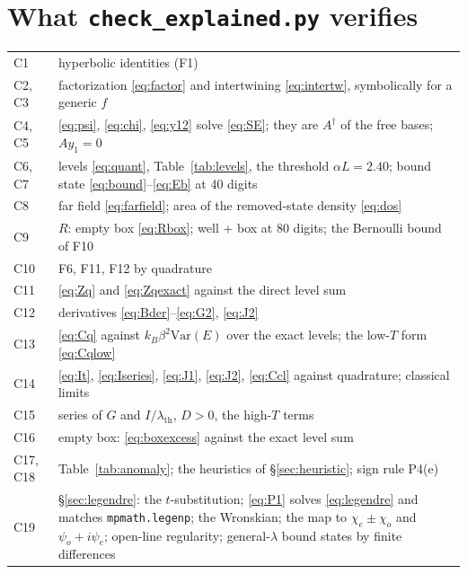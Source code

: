 \documentclass[11pt]{article}
\numberwithin{equation}{section}
\newcommand{\lth}{\lambda_{\mathrm{th}}}
\newcommand{\kB}{k_B}
\newcommand{\Ad}{A^{\dagger}}
\begin{document}
\section{What \texttt{check\_explained.py} verifies}
\label{app:checks}
\begin{center}
\small
\begin{tabular}{lp{}}
\toprule
C1 & hyperbolic identities (F1)\\
C2, C3 & factorization \eqref{eq:factor} and intertwining \eqref{eq:intertw}, symbolically for a generic $f$\\
C4, C5 & \eqref{eq:psi}, \eqref{eq:chi}, \eqref{eq:y12} solve \eqref{eq:SE}; they are $\Ad$ of the free bases; $Ay_1=0$\\
C6, C7 & levels \eqref{eq:quant}, Table~\ref{tab:levels}, the threshold $\alpha L=2.40$; bound state \eqref{eq:bound}--\eqref{eq:Eb} at 40 digits\\
C8 & far field \eqref{eq:farfield}; area of the removed-state density \eqref{eq:dos}\\
C9 & $R$: empty box \eqref{eq:Rbox}; well + box at 80 digits; the Bernoulli bound of F10\\
C10 & F6, F11, F12 by quadrature\\
C11 & \eqref{eq:Zq} and \eqref{eq:Zqexact} against the direct level sum\\
C12 & derivatives \eqref{eq:Bder}--\eqref{eq:G2}, \eqref{eq:J2}\\
C13 & \eqref{eq:Cq} against $\kB\beta^2\mathrm{Var}(E)$ over the exact levels; the low-$T$ form \eqref{eq:Cqlow}\\
C14 & \eqref{eq:It}, \eqref{eq:Iseries}, \eqref{eq:J1}, \eqref{eq:J2}, \eqref{eq:Ccl} against quadrature; classical limits\\
C15 & series of $G$ and $I/\lth$, $D>0$, the high-$T$ terms\\
C16 & empty box: \eqref{eq:boxexcess} against the exact level sum\\
C17, C18 & Table~\ref{tab:anomaly}; the heuristics of \S\ref{sec:heuristic}; sign rule P4(e)\\
C19 & \S\ref{sec:legendre}: the $t$-substitution; \eqref{eq:P1} solves \eqref{eq:legendre} and matches \texttt{mpmath.legenp}; the Wronskian; the map to $\chi_e\pm\chi_o$ and $\psi_o+i\psi_e$; open-line regularity; general-$\lambda$ bound states by finite differences\\
\bottomrule
\end{tabular}
\end{center}
\end{document}
